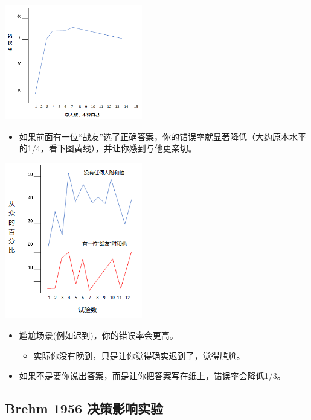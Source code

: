 \includegraphics[width=6cm]{Asch3Screenshot_2022-07-08_2013411.png}

\begin{itemize}
\tightlist
\item
  如果前面有一位``战友''选了正确答案，你的错误率就显著降低（大约原本水平的1/4，看下图黄线），并让你感到与他更亲切。
\end{itemize}

\includegraphics[width=6cm]{Asch4Screenshot_2022-07-08_2015021.png}

\begin{itemize}
\tightlist
\item
  尴尬场景(例如迟到)，你的错误率会更高。

  \begin{itemize}
  \tightlist
  \item
    实际你没有晚到，只是让你觉得确实迟到了，觉得尴尬。
  \end{itemize}
\item
  如果不是要你说出答案，而是让你把答案写在纸上，错误率会降低1/3。
\end{itemize}

\hypertarget{brehm-1956-ux51b3ux7b56ux5f71ux54cdux5b9eux9a8c}{%
\subsection{Brehm 1956
决策影响实验}\label{brehm-1956-ux51b3ux7b56ux5f71ux54cdux5b9eux9a8c}}

